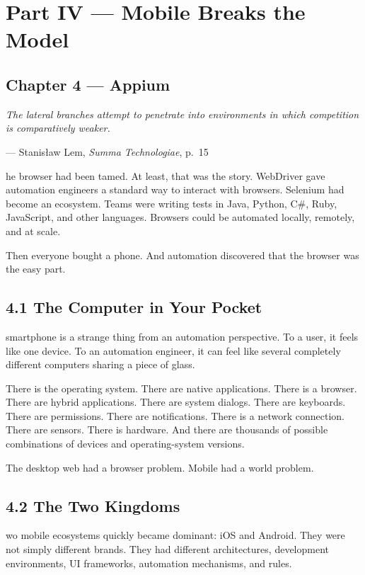 \documentclass[11pt, a4paper, openany]{book}
\newcommand{\initialcap}[1]{{\fontfamily{lmss}\selectfont\huge\textbf{#1}}}
\providecommand{\epigraphlem}[2]{%
  \begin{flushright}\begin{minipage}{0.72\textwidth}\raggedleft
  \itshape #1\par\vspace{0.4em}\normalfont\small --- #2
  \end{minipage}\end{flushright}\vspace{1.2em}}
\begin{document}
\mainmatter

\chapter*{Part IV --- Mobile Breaks the Model}

\section*{Chapter 4 --- Appium}

\epigraphlem{The lateral branches attempt to penetrate into environments in which competition is comparatively weaker.}{Stanisław Lem, \textit{Summa Technologiae}, p.~15}


\noindent \initialcap{T}he browser had been tamed. At least, that was the story. WebDriver gave automation engineers a standard way to interact with browsers. Selenium had become an ecosystem. Teams were writing tests in Java, Python, C\#, Ruby, JavaScript, and other languages. Browsers could be automated locally, remotely, and at scale. 

Then everyone bought a phone. And automation discovered that the browser was the easy part.

\section{4.1 The Computer in Your Pocket}
\noindent \initialcap{A} smartphone is a strange thing from an automation perspective. To a user, it feels like one device. To an automation engineer, it can feel like several completely different computers sharing a piece of glass. 

There is the operating system. There are native applications. There is a browser. There are hybrid applications. There are system dialogs. There are keyboards. There are permissions. There are notifications. There is a network connection. There are sensors. There is hardware. And there are thousands of possible combinations of devices and operating-system versions. 

The desktop web had a browser problem. Mobile had a world problem.

\section{4.2 The Two Kingdoms}
\noindent \initialcap{T}wo mobile ecosystems quickly became dominant: iOS and Android. They were not simply different brands. They had different architectures, development environments, UI frameworks, automation mechanisms, and rules. 
\end{document}
